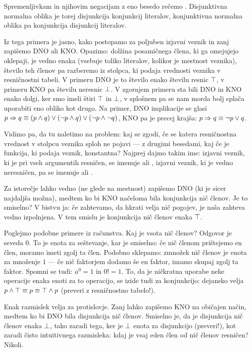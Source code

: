                 Spremenljivkam in njihovim negacijam z eno besedo rečemo . Disjunktivna normalna oblika je torej disjunkcija konjunkcij literalov, konjunktivna normalna oblika pa konjunkcija disjunkcij literalov.

                Iz tega primera je jasno, kako postopamo za poljuben izjavni veznik in zanj zapišemo DNO ali KNO. Opazimo: dolžina posamičnega člena, ki ga omejujejo oklepaji, je vedno enaka (vsebuje toliko literalov, kolikor je mestnost veznika), število teh členov pa razberemo iz stolpca, ki podaja vrednosti veznika v resničnostni tabeli. V primeru DNO je to število enako številu resnic $\top$, v primeru KNO pa številu neresnic $\bot$. V zgornjem primeru sta bili DNO in KNO enako dolgi, ker smo imeli štiri $\top$ in $\bot$, v splošnem pa se nam morda bolj splača uporabiti eno obliko kot drugo. Na primer, DNO implikacije se glasi $p \Rightarrow q \equiv (p \land q) \lor (\lnot{p} \land q) \lor (\lnot{p} \land \lnot{q})$, KNO pa je precej krajša: $p \Rightarrow q \equiv \lnot{p} \lor q$.

                Vidimo pa, da tu naletimo na problem: kaj se zgodi, če se katera resničnostna vrednost v stolpcu veznika sploh ne pojavi --- z drugimi besedami, kaj če je funkcija, ki podaja veznik, konstantna? Najprej dajmo takim ime: izjavni veznik, ki je pri vseh argumentih resničen, se imenuje  ali , izjavni veznik, ki je vedno neresničen, pa se imenuje  ali .

                Za istorečje lahko vedno (ne glede na mestnost) zapišemo DNO (ki je sicer najdaljša možna), medtem ko bi KNO načeloma bila konjunkcija nič členov. Je to smiselno? V bistvu ja: če zahtevamo, da hkrati velja nič pogojev, je naša zahteva vedno izpolnjena. V tem smislu je konjunkcija nič členov enaka $\top$.

                Poglejmo podobne primere iz računstva. Kaj je vsota nič členov? Odgovor je seveda $0$. To je enota za seštevanje, kar je smiselno: če nič členom prištejemo en člen, moramo imeti zgolj ta člen. Podobno sklepamo: zmnožek nič členov je enota za množenje $1$ --- če nič faktorjem dodamo še en faktor, imamo skupaj zgolj ta faktor. Spomni se tudi: $a^0 = 1$ in $0! = 1$. To, da je ničkratna uporabe neke operacije enaka enoti za to operacijo, se izide tudi za konjunkcijo: dejansko velja $p \land \top \equiv p \equiv \top \land p$ (preveri z resničnostno tabelo!).

                Enak razmislek velja za protislovje. Zanj lahko zapišemo KNO na običajen način, medtem ko bi DNO bila disjunkcija nič členov. Smiselno je, da je disjunkcija nič členov enaka $\bot$, tako zaradi tega, ker je $\bot$ enota za disjunkcijo (preveri!), kot zaradi čisto intuitivnega razmisleka: kdaj je vsaj eden člen od nič členov resničen? Nikoli.

